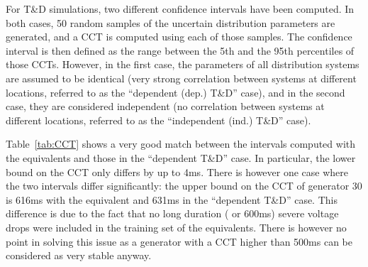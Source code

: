 
For T\&D simulations, two different confidence intervals have been computed. In both cases, 50 random samples of the uncertain distribution parameters are generated, and a CCT is computed using each of those samples. The confidence interval is then defined as the range between the 5th and the 95th percentiles of those CCTs. However, in the first case, the parameters of all distribution systems are assumed to be identical (very strong correlation between systems at different locations, referred to as the ``dependent (dep.) T\&D'' case), and in the second case, they are considered independent (no correlation between systems at different locations, referred to as the ``independent (ind.) T\&D'' case).

Table~\ref{tab:CCT} shows a very good match between the intervals computed with the equivalents and those in the ``dependent T\&D'' case. In particular, the lower bound on the CCT only differs by up to 4ms. There is however one case where the two intervals differ significantly: the upper bound on the CCT of generator 30 is 616ms with the equivalent and 631ms in the ``dependent T\&D'' case. This difference is due to the fact that no long duration ( or 600ms) severe voltage drops were included in the training set of the equivalents. There is however no point in solving this issue as a generator with a CCT higher than 500ms can be considered as very stable anyway.

